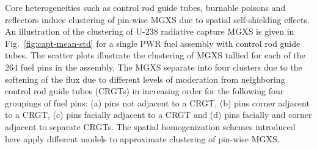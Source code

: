 \documentclass[12pt,twoside]{mitthesis-exec}
\begin{document}
Core heterogeneities such as control rod guide tubes, burnable poisons and reflectors induce clustering of pin-wise MGXS due to spatial self-shielding effects. An illustration of the clustering of U-238 radiative capture MGXS is given in Fig.~\ref{fig:capt-mean-std} for a single PWR fuel assembly with control rod guide tubes. The scatter plots illustrate the clustering of MGXS tallied for each of the 264 fuel pins in the assembly. The MGXS separate into four clusters due to the softening of the flux due to different levels of moderation from neighboring control rod guide tubes (CRGTs) in increasing order for the following four groupings of fuel pins: (a) pins not adjacent to a CRGT, (b) pins corner adjacent to a CRGT, (c) pins facially adjacent to a CRGT and (d) pins facially and corner adjacent to separate CRGTs. The spatial homogenization schemes introduced here apply different models to approximate clustering of pin-wise MGXS.

\end{document}

